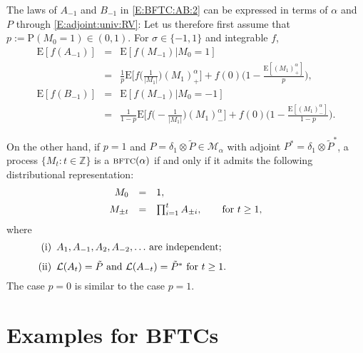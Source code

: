 \documentclass{aptpubarxiv}
\numberwithin{equation}{section}
\begin{document}
The laws of $A_{-1}$ and $B_{-1}$ in \eqref{E:BFTC:AB:2} can be expressed in terms of $\alpha$ and $P$ through \eqref{E:adjoint:univ:RV}: Let us therefore first assume that $p:={\mathrm{P}}(M_0=1) \in (0,1)$. For $\sigma \in \{-1,1\}$ and integrable $f$,
\begin{equation}
\label{E:BFTC:AB:4}
	\begin{array}{rcl}
	{\mathrm{E}} [ f(A_{-1}) ]
        &=& {\mathrm{E}}[f(M_{-1})|M_0=1] \\
        &=& \displaystyle \frac{1}{p} {\mathrm{E}} \biggl[ f \biggl( \frac{1}{|M_1|} \biggr) (M_1)_+^\alpha \biggr]
	+  f(0)\biggl( 1 - \frac{{\mathrm{E}}[(M_1)_+^\alpha]}{p} \biggr), \\[1ex]
	{\mathrm{E}} [ f(B_{-1}) ]
        &=& {\mathrm{E}}[f(M_{-1})|M_0=-1] \\
	&=& \displaystyle \frac{1}{1-p} {\mathrm{E}} \biggl[ f \biggl(-\frac{1}{|M_1|} \biggr) (M_1)_-^\alpha \biggr]
	+ f(0)\biggl( 1 - \frac{{\mathrm{E}}[(M_1)_-^\alpha]}{1-p} \biggr).
	\end{array}
\end{equation}

On the other hand, if $p = 1$ and $P = \delta_1 \otimes \tilde{P} \in {\mathcal{M}}_{\alpha}$ with adjoint $P^* = \delta_1 \otimes \tilde{P}^*$, a process $\{ M_t: t \in \mathbb{Z} \}$ is a ${\mbox{\sc bftc}}(\alpha)$ if and only if it admits the following distributional representation:
\begin{equation}
\label{E:BFTC:A:1}
	\begin{array}[t]{rcl}
	M_0 &=& 1, \\[1ex]
	M_{\pm t} &=& \prod_{i=1}^t A_{\pm i}, \qquad \mbox{for $t \geq 1$},
	\end{array}
\end{equation}
where
\begin{equation}
\label{E:BFTC:A:2}
\mbox{\begin{minipage}[t]{0.90\textwidth}
\begin{itemize}
\item[(i)] $A_1, A_{-1}, A_2, A_{-2}, \ldots$ are independent;
\item[(ii)] ${\mathcal{L}}(A_t) = \tilde{P}$ and ${\mathcal{L}}(A_{-t}) = \tilde{P}^\ast$ for $t \geq 1$.
\end{itemize}
\end{minipage}}
\end{equation}
The case $p = 0$ is similar to the case $p = 1$.
\fi

\section{Examples for BFTCs}
\label{S:examples}
\end{document}
